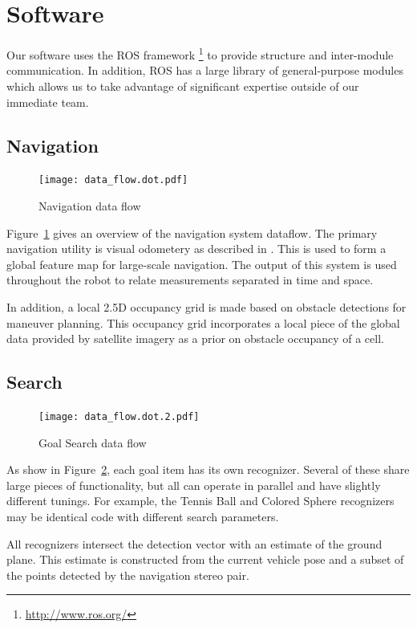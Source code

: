 \documentclass[12pt]{article}
\begin{document}
\section{Software}\label{Software}
Our software uses the ROS framework \footnote{\url{http://www.ros.org/}} to provide structure and inter-module communication. In addition, ROS has a large library of general-purpose modules which allows us to take advantage of significant expertise outside of our immediate team.

\subsection{Navigation}\label{Navigation}
\begin{figure}[htbp]
\centering
\texttt{[image: data\_flow.dot.pdf]}
\caption{Navigation data flow}
\label{fig_df_nav}
\end{figure}
Figure~\ref{fig_df_nav} gives an overview of the navigation system dataflow. The primary navigation utility is visual odometery as described in \cite{HStrasDWO}. This is used to form a global feature map for large-scale navigation. The output of this system is used throughout the robot to relate measurements separated in time and space.

In addition, a local 2.5D occupancy grid is made based on obstacle detections for maneuver planning. This occupancy grid incorporates a local piece of the global data provided by satellite imagery as a prior on obstacle occupancy of a cell.

\subsection{Search}\label{Search}
\begin{figure}[htbp]
\centering
\texttt{[image: data\_flow.dot.2.pdf]}
\caption{Goal Search data flow}
\label{fig_df_gs}
\end{figure}
As show in Figure~\ref{fig_df_gs}, each goal item has its own recognizer. Several of these share large pieces of functionality, but all can operate in parallel and have slightly different tunings. For example, the Tennis Ball and Colored Sphere recognizers may be identical code with different search parameters.

All recognizers intersect the detection vector with an estimate of the ground plane. This estimate is constructed from the current vehicle pose and a subset of the points detected by the navigation stereo pair.
\end{document}
